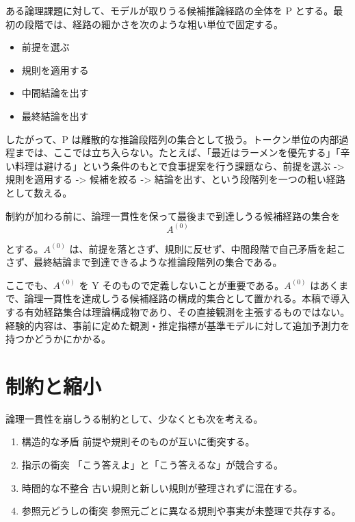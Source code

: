 \documentclass[12pt,a4paper]{article}
\begin{document}
ある論理課題に対して、モデルが取りうる候補推論経路の全体を P とする。最初の段階では、経路の細かさを次のような粗い単位で固定する。

\begin{itemize}
\tightlist
\item
  前提を選ぶ
\item
  規則を適用する
\item
  中間結論を出す
\item
  最終結論を出す
\end{itemize}

したがって、P は離散的な推論段階列の集合として扱う。トークン単位の内部過程までは、ここでは立ち入らない。たとえば、「最近はラーメンを優先する」「辛い料理は避ける」という条件のもとで食事提案を行う課題なら、前提を選ぶ -\textgreater{} 規則を適用する -\textgreater{} 候補を絞る -\textgreater{} 結論を出す、という段階列を一つの粗い経路として数える。

制約が加わる前に、論理一貫性を保って最後まで到達しうる候補経路の集合を \[
A^{(0)}
\]

とする。\(A^{(0)}\) は、前提を落とさず、規則に反せず、中間段階で自己矛盾を起こさず、最終結論まで到達できるような推論段階列の集合である。

ここでも、\(A^{(0)}\) を Y そのもので定義しないことが重要である。\(A^{(0)}\) はあくまで、論理一貫性を達成しうる候補経路の構成的集合として置かれる。本稿で導入する有効経路集合は理論構成物であり、その直接観測を主張するものではない。経験的内容は、事前に定めた観測・推定指標が基準モデルに対して追加予測力を持つかどうかにかかる。

\section{制約と縮小}\label{ux5236ux7d04ux3068ux7e2eux5c0f}

論理一貫性を崩しうる制約として、少なくとも次を考える。

\begin{enumerate}
\def\labelenumi{\arabic{enumi}.}
\item
  構造的な矛盾 前提や規則そのものが互いに衝突する。
\item
  指示の衝突 「こう答えよ」と「こう答えるな」が競合する。
\item
  時間的な不整合 古い規則と新しい規則が整理されずに混在する。
\item
  参照元どうしの衝突 参照元ごとに異なる規則や事実が未整理で共存する。
\end{enumerate}
\end{document}
